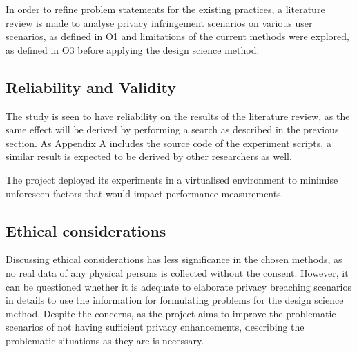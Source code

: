 In order to refine problem statements for the existing practices, a literature review is made to analyse privacy infringement scenarios on various user scenarios, as defined in O1 and limitations of the current methods were explored, as defined in O3 before applying the design science method.


\subsection{Reliability and Validity}
The study is seen to have reliability on the results of the literature review, as the same effect will be derived by performing a search as described in the previous section. As Appendix A includes the source code of the experiment scripts, a similar result is expected to be derived by other researchers as well. 

The project deployed its experiments in a virtualised environment to minimise unforeseen factors that would impact performance measurements.

\subsection{Ethical considerations}
Discussing ethical considerations has less significance in the chosen methods, as no real data of any physical persons is collected without the consent.
However, it can be questioned whether it is adequate to elaborate privacy breaching scenarios in details to use the information for formulating problems for the design science method.
Despite the concerns, as the project aims to improve the problematic scenarios of not having sufficient privacy enhancements, describing the problematic situations as-they-are is necessary.